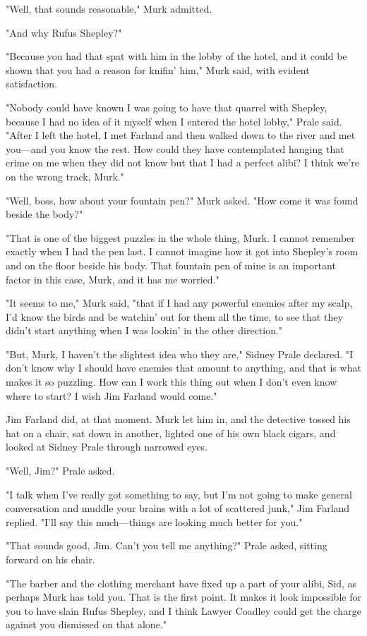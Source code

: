 \documentclass{novel}
\begin{document}
"Well, that sounds reasonable," Murk admitted.

"And why Rufus Shepley?"

"Because you had that spat with him in the lobby of the hotel, and it could be shown that you had a reason for knifin' him," Murk said, with evident satisfaction.

"Nobody could have known I was going to have that quarrel with Shepley, because I had no idea of it myself when I entered the hotel lobby," Prale said. "After I left the hotel, I met Farland and then walked down to the river and met you---and you know the rest. How could they have contemplated hanging that crime on me when they did not know but that I had a perfect alibi? I think we're on the wrong track, Murk."

"Well, boss, how about your fountain pen?" Murk asked. "How come it was found beside the body?"

"That is one of the biggest puzzles in the whole thing, Murk. I cannot remember exactly when I had the pen last. I cannot imagine how it got into Shepley's room and on the floor beside his body. That fountain pen of mine is an important factor in this case, Murk, and it has me worried."

"It seems to me," Murk said, "that if I had any powerful enemies after my scalp, I'd know the birds and be watchin' out for them all the time, to see that they didn't start anything when I was lookin' in the other direction."

"But, Murk, I haven't the slightest idea who they are," Sidney Prale declared. "I don't know why I should have enemies that amount to anything, and that is what makes it so puzzling. How can I work this thing out when I don't even know where to start? I wish Jim Farland would come."

Jim Farland did, at that moment. Murk let him in, and the detective tossed his hat on a chair, sat down in another, lighted one of his own black cigars, and looked at Sidney Prale through narrowed eyes.

"Well, Jim?" Prale asked.

"I talk when I've really got something to say, but I'm not going to make general conversation and muddle your brains with a lot of scattered junk," Jim Farland replied. "I'll say this much---things are looking much better for you."

"That sounds good, Jim. Can't you tell me anything?" Prale asked, sitting forward on his chair.

"The barber and the clothing merchant have fixed up a part of your alibi, Sid, as perhaps Murk has told you. That is the first point. It makes it look impossible for you to have slain Rufus Shepley, and I think Lawyer Coadley could get the charge against you dismissed on that alone."
\end{document}
